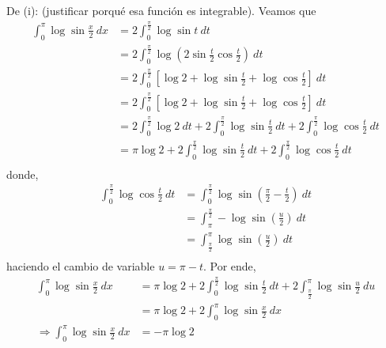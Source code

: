\documentclass[12pt]{report}
\newcounter{it}
\theoremstyle{largebreak}
\begin{document}
    \begin{sol}
        De (i): (justificar porqué esa función es integrable). Veamos que
        \begin{equation*}
            \begin{split}
                \int_0^\pi\log\sin\frac{x}{2}\:dx&=2\int_0^{\frac{\pi}{2}}\log\sin t\:dt\\
                &=2\int_0^{\frac{\pi}{2}}\log\left(2\sin
                \frac{t}{2}\cos\frac{t}{2}\right) \:dt\\
                &=2\int_0^{\frac{\pi}{2}}\left[\log2+\log\sin\frac{t}{2}+\log\cos\frac{t}{2} \right]  \:dt\\
                &=2\int_0^{\frac{\pi}{2}}\left[\log2+\log\sin\frac{t}{2}+\log\cos\frac{t}{2} \right]  \:dt\\
                &=2\int_0^{\frac{\pi}{2}}\log2\:dt+2\int_0^{\frac{\pi}{2}}\log\sin\frac{t}{2}\:dt+2\int_0^{\frac{\pi}{2}}\log\cos\frac{t}{2}\:dt\\
                &=\pi\log2+2\int_0^{\frac{\pi}{2}}\log\sin\frac{t}{2}\:dt+2\int_0^{\frac{\pi}{2}}\log\cos\frac{t}{2}\:dt\\
            \end{split}
        \end{equation*}
        donde,
        \begin{equation*}
            \begin{split}
                \int_0^{\frac{\pi}{2}}\log\cos\frac{t}{2}\:dt&=\int_0^{\frac{\pi}{2}}\log\sin\left(\frac{\pi}{2}-\frac{t}{2}\right) \:dt\\
                &=\int_{\pi}^{\frac{\pi}{2}}-\log\sin\left(\frac{u}{2}\right) \:dt\\
                &=\int_{\frac{\pi}{2}}^{\pi}\log\sin\left(\frac{u}{2}\right) \:dt\\
            \end{split}
        \end{equation*}
        haciendo el cambio de variable $u=\pi-t$. Por ende,
        \begin{equation*}
            \begin{split}
                \int_0^\pi\log\sin\frac{x}{2}\:dx&=\pi\log2+2\int_0^{\frac{\pi}{2}}\log\sin\frac{t}{2}\:dt+2\int_{\frac{\pi}{2}}^{\pi}\log\sin\frac{u}{2}\:du\\
                &=\pi\log2+2\int_0^{\pi}\log\sin\frac{x}{2}\:dx\\
                \Rightarrow \int_0^\pi\log\sin\frac{x}{2}\:dx&=-\pi\log2\\
            \end{split}
        \end{equation*}
        

\end{sol}
\end{document}
